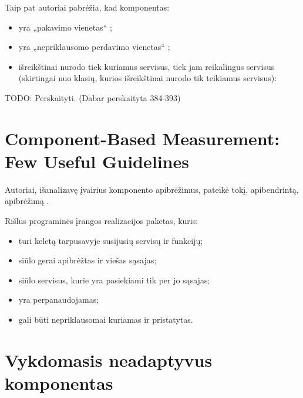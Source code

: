 Taip pat autoriai pabrėžia, kad komponentas:
\begin{itemize}
  \item yra „pakavimo vienetas“ %
    \cite[387]{objects-components-and-frameworks-with-uml};
  \item yra „nepriklausomo perdavimo vienetas“ \cite[387]{objects-components-and-frameworks-with-uml};
  \item išreikštinai nurodo tiek kuriamus servisus, tiek jam
    reikalingus servisus (skirtingai nuo klasių, kurios išreikštinai
    nurodo tik teikiamus servisus):
\end{itemize}

TODO: Perskaityti. (Dabar perskaityta 384-393)

\section{Component-Based Measurement: Few Useful Guidelines}

Autoriai, išanalizavę įvairius komponento apibrėžimus, pateikė tokį,
apibendrintą, apibrėžimą \cite[2]{Gill:2003:CMF:966221.966237}.
\begin{defn}[Komponentas]
  Rišlus programinės įrangos realizacijos paketas, kuris:
  \begin{itemize}
    \item turi keletą tarpusavyje susijusių servisų ir funkcijų;
    \item siūlo gerai apibrėžtas ir viešas sąsajas;
    \item siūlo servisus, kurie yra pasiekiami tik per jo sąsajas;
    \item yra perpanaudojamas;
    \item gali būti nepriklausomai kuriamas ir pristatytas.
  \end{itemize}
\end{defn}

\section{Vykdomasis neadaptyvus komponentas}

